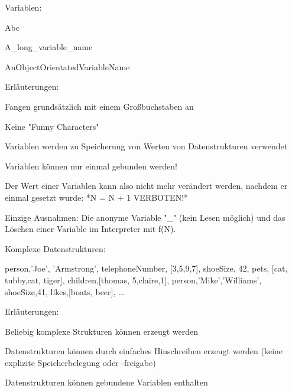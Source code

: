 \documentclass[10pt]{article}
\begin{document}
\begin{itemize*}
Variablen:
\begin{itemize*}
  \item Abc
  \item A\_long\_variable\_name
  \item AnObjectOrientatedVariableName
  \item Erläuterungen:
  \begin{itemize*}
    \item Fangen grundsätzlich mit einem Großbuchstaben an
    \item Keine "Funny Characters"
    \item Variablen werden zu Speicherung von Werten von Datenstrukturen verwendet
    \item Variablen können nur einmal gebunden werden!
    \item Der Wert einer Variablen kann also nicht mehr verändert werden, nachdem er einmal gesetzt wurde: *N = N + 1 VERBOTEN!*
    \item Einzige Ausnahmen: Die anonyme Variable "\_" (kein Lesen möglich) und das Löschen einer Variable im Interpreter mit f(N).
  \end{itemize*}
\end{itemize*}

Komplexe Datenstrukturen:
\begin{itemize*}
  \item [{{person,'Joe', 'Armstrong'}, {telephoneNumber, [3,5,9,7]}, {shoeSize, 42}, {pets, [{cat, tubby},{cat, tiger}]}, {children,[{thomas, 5},{claire,1}]}}, {{person,'Mike','Williams'}, {shoeSize,41}, {likes,[boats, beer]}, ... }]
  \item Erläuterungen:
  \begin{itemize*}
    \item Beliebig komplexe Strukturen können erzeugt werden
    \item Datenstrukturen können durch einfaches Hinschreiben erzeugt werden (keine explizite Speicherbelegung oder -freigabe)
    \item Datenstrukturen können gebundene Variablen enthalten
  \end{itemize*}
\end{itemize*}


\end{itemize*}
\end{document}
